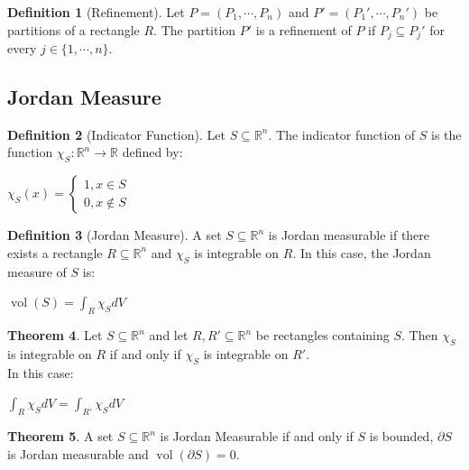 \documentclass[12pt]{article}
\theoremstyle{definition}
\newtheorem{definition}{Definition}[subsection]
\newtheorem{theorem}[definition]{Theorem}
\theoremstyle{remark}
\begin{document}
\begin{definition}[Refinement]
Let $P=(P_1,\cdots,P_n)$ and $P'=(P_1',\cdots,P_n')$ be partitions of a rectangle $R$. The partition $P'$ is a refinement of $P$ if $P_j\subseteq P_j'$ for every $j\in\{1,\cdots,n\}$.
\end{definition}

\subsection{Jordan Measure}
\begin{definition}[Indicator Function]
Let $S\subseteq \mathbb{R}^n$. The indicator function of $S$ is the function $\chi_S:\mathbb{R}^n\to\mathbb{R}$ defined by:

\hfil$\chi_S(x)=\begin{cases}1,x\in S\\0, x\notin S\end{cases}$\hfil

\end{definition}

\begin{definition}[Jordan Measure]
A set $S\subseteq \mathbb{R}^n$ is Jordan measurable if there exists a rectangle $R\subseteq\mathbb{R}^n$ and $\chi_S$ is integrable on $R.$ In this case, the Jordan measure of $S$ is:

\hfil$\displaystyle \operatorname{vol}(S)=\int_R\chi_S dV$\hfil

\end{definition}

\begin{theorem}
Let $S\subseteq\mathbb{R}^n$ and let $R, R'\subseteq\mathbb{R}^n$ be rectangles containing $S.$ Then $\chi_S$ is integrable on $R$ if and only if $\chi_S$ is integrable on $R'.$\\ In this case:

\hfil$\displaystyle \int_R \chi_SdV=\int_{R'}\chi_SdV$\hfil

\end{theorem}

\begin{theorem}
A set $S\subseteq\mathbb{R}^n$ is Jordan Measurable if and only if $S$ is bounded, $\partial S$ is Jordan measurable and $\operatorname{vol}(\partial S)=0.$
\end{theorem}
\end{document}
